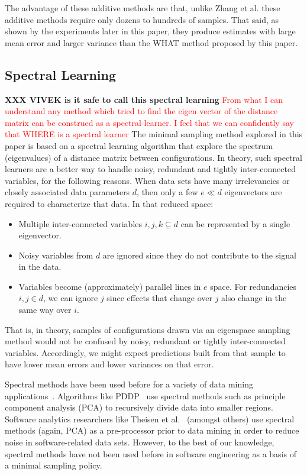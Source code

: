 \documentclass{sig-alternative}
\newcommand{\bi}{\begin{itemize}}%
\newcommand{\ei}{\end{itemize}}
\begin{document}
The advantage of these additive methods are that, unlike  Zhang et al. these additive methods require only dozens to hundreds of samples. That said, as shown by the experiments later in this
paper, they produce estimates with large mean error and larger variance than the WHAT method proposed by
this paper.
 

\subsection{Spectral Learning}\label{sect:spect}

{\bf XXX VIVEK is it safe to call this spectral learning}
\textcolor{red}{From what I can understand any method which tried to find the eigen vector of the distance matrix can be construed as a spectral learner. I feel that we can confidently say that WHERE is a spectral learner}
The minimal sampling method explored in this paper is based on a spectral learning algorithm
that  explore the spectrum (eigenvalues) of a distance matrix between  configurations.
In theory, such spectral learners are a better way to handle noisy, redundant and tightly inter-connected variables, for the following reasons.
When data sets have many irrelevancies   or closely associated data parameters $d$, then
only a few $e \ll d$ eigenvectors are required to characterize that data.
In that reduced space:
\bi
\item
Multiple inter-connected variables $i,j,k \subseteq d$ can be represented
by a single eigenvector.
\item
Noisy variables from $d$ are
ignored since they  do not contribute to the signal in the data.
\item
Variables  become (approximately) parallel lines
in $e$ space. For  redundancies \mbox{$i,j \in d$}, we
can ignore $j$
since effects that change over $j$ also
change in the same way over $i$.
\ei
That is, in theory, samples of configurations drawn via an eigenspace sampling method
would not be confused by noisy, redundant or tightly inter-connected variables. Accordingly,
we might expect predictions built from that sample to have  lower mean errors and lower variances on that error.

Spectral methods have been used before for a variety of data mining applications~\cite{kamvar2003spectral}.
Algorithms like PDDP~\cite{boley98} use spectral methods such as principle component analysis (PCA) to
recursively divide data into smaller regions.  Software analytics researchers like Theisen et al.~\cite{Theisen15} (amongst
others) use spectral methods (again, PCA) as a pre-processor prior to data mining in order to reduce noise in software-related data sets.
However, to the best of our knowledge, spectral methods have not been used before in software engineering as a basis 
of a minimal sampling policy.
\end{document}

